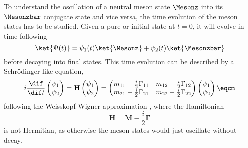 To understand the oscillation of a neutral meson state $\Mesonz$ into its
$\Mesonzbar$ \CP conjugate state and vice versa, the time evolution of the meson
states has to be studied. Given a pure \Mesonz or \Mesonzbar initial state at
$t=0$, it will evolve in time following
%
\begin{equation}
  \ket{\Psi(t)} = \psi_1(t) \ket{\Mesonz} + \psi_2(t) \ket{\Mesonzbar}
\end{equation}
%
before decaying into final states. This time evolution can be described by a
Schrödinger-like equation,
%
\begin{equation}
  i \frac{\dif}{\dif t} 
  \begin{pmatrix}
    \psi_1 \\
    \psi_2
  \end{pmatrix}
  =
  \mathbf{H}
  \begin{pmatrix}
    \psi_1 \\
    \psi_2
  \end{pmatrix}
  =
  \begin{pmatrix}
    m_{11} - \frac{i}{2} \Gamma_{11}    & m_{12} - \frac{i}{2} \Gamma_{12} \\
    m_{21} - \frac{i}{2} \Gamma_{21}    & m_{22} - \frac{i}{2} \Gamma_{22} \\
  \end{pmatrix}
  \begin{pmatrix}
    \psi_1 \\
    \psi_2
  \end{pmatrix}\eqcm
\end{equation}
%
following the Weisskopf-Wigner approximation
\cite{Weisskopf:1930au,Weisskopf:1930ps}, where the Hamiltonian
%
\begin{equation}
  \mathbf{H} = \mathbf{M} - \frac{i}{2} \mathbf{\Gamma}
\end{equation}
%
is not Hermitian, as otherwise the meson states would just oscillate without
decay.

